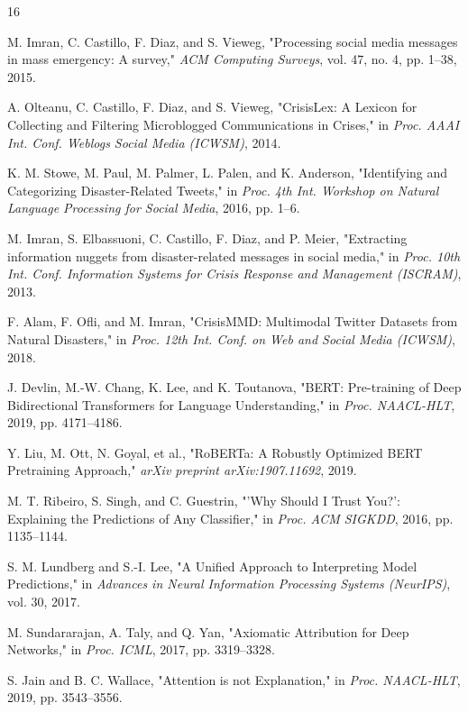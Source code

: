 \documentclass[pdflatex,sn-mathphys-num]{sn-jnl}%
\theoremstyle{thmstyleone}%
\theoremstyle{thmstyletwo}%
\theoremstyle{thmstylethree}%
\begin{document}
\begin{thebibliography}{16}

M. Imran, C. Castillo, F. Diaz, and S. Vieweg, "Processing social media messages in mass emergency: A survey," \textit{ACM Computing Surveys}, vol. 47, no. 4, pp. 1--38, 2015.

A. Olteanu, C. Castillo, F. Diaz, and S. Vieweg, "CrisisLex: A Lexicon for Collecting and Filtering Microblogged Communications in Crises," in \textit{Proc. AAAI Int. Conf. Weblogs Social Media (ICWSM)}, 2014.

K. M. Stowe, M. Paul, M. Palmer, L. Palen, and K. Anderson, "Identifying and Categorizing Disaster-Related Tweets," in \textit{Proc. 4th Int. Workshop on Natural Language Processing for Social Media}, 2016, pp. 1--6.

M. Imran, S. Elbassuoni, C. Castillo, F. Diaz, and P. Meier, "Extracting information nuggets from disaster-related messages in social media," in \textit{Proc. 10th Int. Conf. Information Systems for Crisis Response and Management (ISCRAM)}, 2013.

F. Alam, F. Ofli, and M. Imran, "CrisisMMD: Multimodal Twitter Datasets from Natural Disasters," in \textit{Proc. 12th Int. Conf. on Web and Social Media (ICWSM)}, 2018.

J. Devlin, M.-W. Chang, K. Lee, and K. Toutanova, "BERT: Pre-training of Deep Bidirectional Transformers for Language Understanding," in \textit{Proc. NAACL-HLT}, 2019, pp. 4171--4186.

Y. Liu, M. Ott, N. Goyal, et al., "RoBERTa: A Robustly Optimized BERT Pretraining Approach," \textit{arXiv preprint arXiv:1907.11692}, 2019.

M. T. Ribeiro, S. Singh, and C. Guestrin, "'Why Should I Trust You?': Explaining the Predictions of Any Classifier," in \textit{Proc. ACM SIGKDD}, 2016, pp. 1135--1144.

S. M. Lundberg and S.-I. Lee, "A Unified Approach to Interpreting Model Predictions," in \textit{Advances in Neural Information Processing Systems (NeurIPS)}, vol. 30, 2017.

M. Sundararajan, A. Taly, and Q. Yan, "Axiomatic Attribution for Deep Networks," in \textit{Proc. ICML}, 2017, pp. 3319--3328.

S. Jain and B. C. Wallace, "Attention is not Explanation," in \textit{Proc. NAACL-HLT}, 2019, pp. 3543--3556.


\end{thebibliography}
\end{document}
